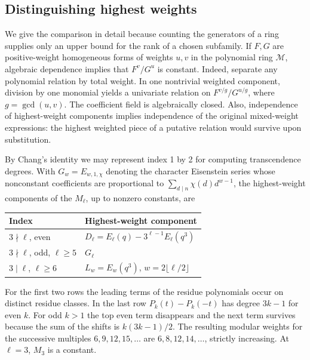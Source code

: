 \documentclass[11pt,a4paper]{article}
\theoremstyle{definition}
\theoremstyle{remark}
\numberwithin{equation}{section}
\begin{document}
\subsection{Distinguishing highest weights}
We give the comparison in detail because counting the generators of a ring supplies only an upper bound for the rank of a chosen subfamily. If $F,G$ are positive-weight homogeneous forms of weights $u,v$ in the polynomial ring $\mathcal M$, algebraic dependence implies that $F^v/G^u$ is constant. Indeed, separate any polynomial relation by total weight. In one nontrivial weighted component, division by one monomial yields a univariate relation on $F^{v/g}/G^{u/g}$, where $g=\gcd(u,v)$. The coefficient field is algebraically closed. Also, independence of highest-weight components implies independence of the original mixed-weight expressions: the highest weighted piece of a putative relation would survive upon substitution.

By Chang's identity we may represent index 1 by 2 for computing transcendence degrees. With $G_w=E_{w,1,\chi}$ denoting the character Eisenstein series whose nonconstant coefficients are proportional to $\sum_{d\mid n}\chi(d)d^{w-1}$, the highest-weight components of the $M_\ell$, up to nonzero constants, are
\begin{center}
\begin{tabular}{@{}ll@{}}\toprule
Index & Highest-weight component\\\midrule
$3\nmid\ell$, even & $D_\ell=E_\ell(q)-3^{\ell-1}E_\ell(q^3)$\\
$3\nmid\ell$, odd, $\ell\ge5$ & $G_\ell$\\
$3\mid\ell$, $\ell\ge6$ & $L_w=E_w(q^3)$, $w=2\lfloor\ell/2\rfloor$\\\bottomrule
\end{tabular}
\end{center}
For the first two rows the leading terms of the residue polynomials occur on distinct residue classes. In the last row $P_k(t)-P_k(-t)$ has degree $3k-1$ for even $k$. For odd $k>1$ the top even term disappears and the next term survives because the sum of the shifts is $k(3k-1)/2$. The resulting modular weights for the successive multiples $6,9,12,15,\ldots$ are $6,8,12,14,\ldots$, strictly increasing. At $\ell=3$, $M_3$ is a constant.
\end{document}
